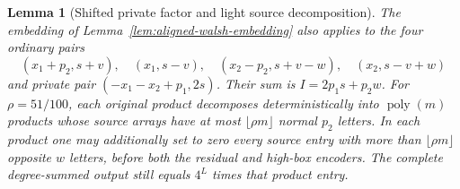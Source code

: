 \documentclass[11pt]{article}
\newtheorem{lemma}[theorem]{Lemma}
\begin{document}
\begin{lemma}[Shifted private factor and light source decomposition]
\label{lem:light-source}
The embedding of Lemma~\ref{lem:aligned-walsh-embedding} also applies to
the four ordinary pairs
\[
 (x_1+p_2,s+v),\quad (x_1,s-v),\quad
 (x_2-p_2,s+v-w),\quad (x_2,s-v+w)
\]
and private pair $(-x_1-x_2+p_1,2s)$. Their sum is
$I=2p_1s+p_2w$. For $\rho=51/100$, each original product decomposes
deterministically into $\operatorname{poly}(m)$ products whose source
arrays have at most $\lfloor\rho m\rfloor$ normal $p_2$ letters.
In each product one may additionally set to zero every source entry
with more than $\lfloor\rho m\rfloor$ opposite $w$ letters, before
both the residual and high-box encoders. The complete degree-summed
output still equals $4^L$ times that product entry.
\end{lemma}
\end{document}
